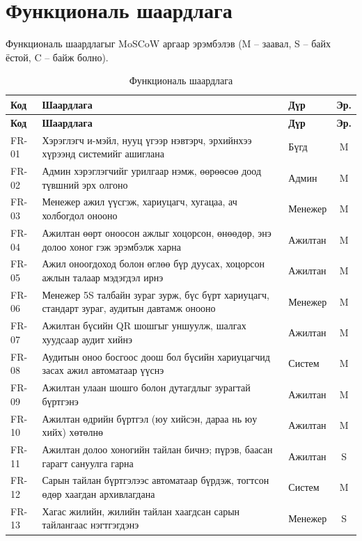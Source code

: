 \section{Функциональ шаардлага}
Функциональ шаардлагыг MoSCoW аргаар эрэмбэлэв (M -- заавал, S -- байх ёстой, C -- байж болно).

\begin{longtable}{|p{1.4cm}|p{9.6cm}|p{2.4cm}|c|}
\caption{Функциональ шаардлага}\label{table:fr}\\ \hline
\textbf{Код} & \textbf{Шаардлага} & \textbf{Дүр} & \textbf{Эр.} \\ \hline
\endfirsthead
\hline
\textbf{Код} & \textbf{Шаардлага} & \textbf{Дүр} & \textbf{Эр.} \\ \hline
\endhead
FR-01 & Хэрэглэгч и-мэйл, нууц үгээр нэвтэрч, эрхийнхээ хүрээнд системийг ашиглана & Бүгд & M \\ \hline
FR-02 & Админ хэрэглэгчийг урилгаар нэмж, өөрөөсөө доод түвшний эрх олгоно & Админ & M \\ \hline
FR-03 & Менежер ажил үүсгэж, хариуцагч, хугацаа, ач холбогдол онооно & Менежер & M \\ \hline
FR-04 & Ажилтан өөрт оноосон ажлыг хоцорсон, өнөөдөр, энэ долоо хоног гэж эрэмбэлж харна & Ажилтан & M \\ \hline
FR-05 & Ажил оноогдоход болон өглөө бүр дуусах, хоцорсон ажлын талаар мэдэгдэл ирнэ & Ажилтан & M \\ \hline
FR-06 & Менежер 5S талбайн зураг зурж, бүс бүрт хариуцагч, стандарт зураг, аудитын давтамж онооно & Менежер & M \\ \hline
FR-07 & Ажилтан бүсийн QR шошгыг уншуулж, шалгах хуудсаар аудит хийнэ & Ажилтан & M \\ \hline
FR-08 & Аудитын оноо босгоос доош бол бүсийн хариуцагчид засах ажил автоматаар үүснэ & Систем & M \\ \hline
FR-09 & Ажилтан улаан шошго болон дутагдлыг зурагтай бүртгэнэ & Ажилтан & M \\ \hline
FR-10 & Ажилтан өдрийн бүртгэл (юу хийсэн, дараа нь юу хийх) хөтөлнө & Ажилтан & M \\ \hline
FR-11 & Ажилтан долоо хоногийн тайлан бичнэ; пүрэв, баасан гарагт сануулга гарна & Ажилтан & S \\ \hline
FR-12 & Сарын тайлан бүртгэлээс автоматаар бүрдэж, тогтсон өдөр хаагдан архивлагдана & Систем & M \\ \hline
FR-13 & Хагас жилийн, жилийн тайлан хаагдсан сарын тайлангаас нэгтгэгдэнэ & Менежер & S \\ \hline

\end{longtable}
